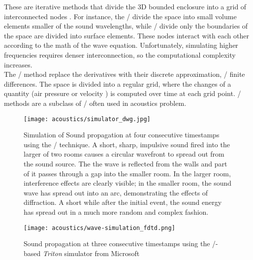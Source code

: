 These are iterative methods that divide the 3D bounded enclosure into a grid of interconnected nodes
.
For instance, the \FEMf/ divide the space into small volume elements smaller of the sound wavelengths, while
\BEMf/ divide only the boundaries of the space are divided into surface elements.
These nodes interact with each other according to the math of the wave equation.
Unfortunately, simulating higher frequencies requires denser interconnection, so the computational complexity increases.
\\The \FDTDf/ method replace the derivatives with their discrete approximation, \ie/ finite differences.
The space is divided into a regular grid, where the changes of a quantity (air pressure or velocity ) is computed over time at each grid point.
\DWMf/ methods are a subclass of \FDTD/ often used in acoustics problem.

\begin{figure}[t]
    \label{fig:acoustics:fdtd}
    \texttt{[image: acoustics/simulator\_dwg.jpg]}
    \caption{Simulation of Sound propagation at four consecutive timestamps using the \DWM/ technique.
    A short, sharp, impulsive sound fired into the larger of two rooms causes a circular wavefront to spread out from the sound source.
    The the wave is reflected from the walls and part of it passes through a gap into the smaller room.
    In the larger room, interference effects are clearly visible;
    in the smaller room, the sound wave has spread out into an arc, demonstrating the effects of diffraction.
    A short while after the initial event, the sound energy has spread out in a much more random and complex fashion.
}
\end{figure}

\begin{figure}[t]
    \label{fig:acoustics:fdtd}
    \centering
    \texttt{[image: acoustics/wave-simulation\_fdtd.png]}
    \caption{Sound propagation at three consecutive timestamps using the \FDTD/-based \textit{Triton} simulator from Microsoft}
\end{figure}

